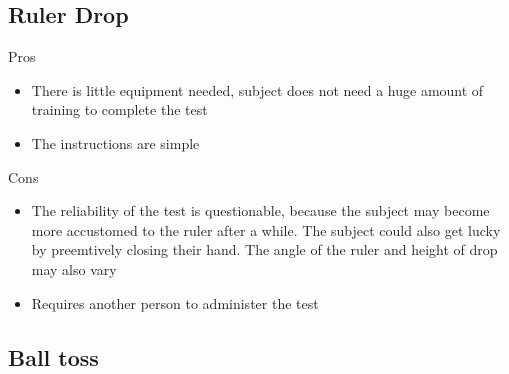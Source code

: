 \documentclass[12pt]{article}
\begin{document}
\subsection*{Ruler Drop}

\begin{minipage}[t]{0.5\textwidth}
    \begin{center}Pros\end{center}
    \begin{itemize}
        \item There is little equipment needed, subject does not need a huge amount of training to complete the test
        \item The instructions are simple
    \end{itemize}
\end{minipage}
\begin{minipage}[t]{0.5\textwidth}
    \begin{center}Cons\end{center}
    \begin{itemize}
        \item The reliability of the test is questionable, because the subject may become more accustomed to the ruler after a while. The subject could also get lucky by preemtively closing their hand. The angle of the ruler and height of drop may also vary
        \item Requires another person to administer the test
    \end{itemize}
\end{minipage}

\subsection*{Ball toss}
\end{document}
